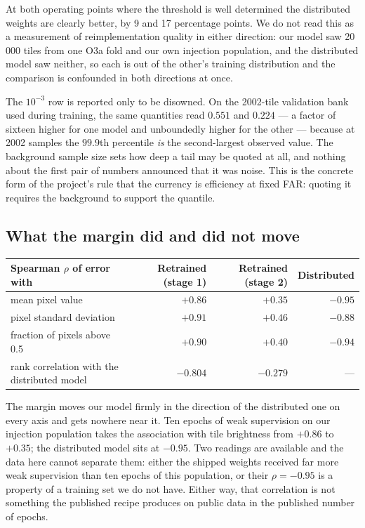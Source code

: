 \documentclass[11pt]{article}
\begin{document}
At both operating points where the threshold is well determined the distributed weights
are clearly better, by 9 and 17 percentage points. We do not read this as a measurement
of reimplementation quality in either direction: our model saw 20\,000 tiles from one
O3a fold and our own injection population, and the distributed model saw neither, so
each is out of the other's training distribution and the comparison is confounded in
both directions at once.

The $10^{-3}$ row is reported only to be disowned. On the 2002-tile validation bank used
during training, the same quantities read $0.551$ and $0.224$ --- a factor of sixteen
higher for one model and unboundedly higher for the other --- because at 2002 samples the
$99.9$th percentile \emph{is} the second-largest observed value. The background sample
size sets how deep a tail may be quoted at all, and nothing about the first pair of
numbers announced that it was noise. This is the concrete form of the project's rule that
the currency is efficiency at fixed FAR: quoting it requires the background to support
the quantile.

\subsection*{What the margin did and did not move}

\begin{center}
\begin{tabular}{lrrr}
\toprule
Spearman $\rho$ of error with & Retrained (stage 1) & Retrained (stage 2) & Distributed \\
\midrule
mean pixel value             & $+0.86$ & $+0.35$ & $-0.95$ \\
pixel standard deviation     & $+0.91$ & $+0.46$ & $-0.88$ \\
fraction of pixels above 0.5 & $+0.90$ & $+0.40$ & $-0.94$ \\
\midrule
rank correlation with the distributed model & $-0.804$ & $-0.279$ & --- \\
\bottomrule
\end{tabular}
\end{center}

The margin moves our model firmly in the direction of the distributed one on every axis
and gets nowhere near it. Ten epochs of weak supervision on our injection population
takes the association with tile brightness from $+0.86$ to $+0.35$; the distributed model
sits at $-0.95$. Two readings are available and the data here cannot separate them: either
the shipped weights received far more weak supervision than ten epochs of this population,
or their $\rho=-0.95$ is a property of a training set we do not have. Either way, that
correlation is not something the published recipe produces on public data in the published
number of epochs.
\end{document}
